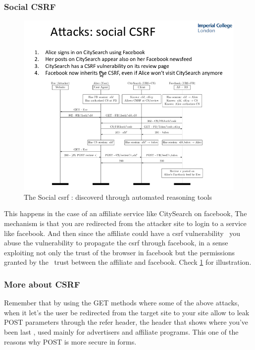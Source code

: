 \subsubsection{Social CSRF}

\begin{figure}[H]
\centering
\includegraphics[width=1\textwidth]{./socialcsrf.png}
\caption{\label{fig:socialcsrf}The Social csrf : discoverd through automated reasoning tools }
\end{figure}
This happens in the case of an affiliate service like CitySearch on facebook, 
The mechanism is that you are redirected from the attacker site to login to a service like facebook. And then since the affiliate could have a csrf vulnerability \
you abuse the vulnerability to propagate the csrf through facebook, in a sense exploiting not only the trust of the browser in facebook but the permissions granted by the \
trust between the affiliate and facebook. Check \ref{fig:socialcsrf} for illustration.

\subsubsection{More about CSRF}

Remember that by using the GET methods where some of the above attacks, when it let's the user be redirected from the target site to your site allow to leak POST parameters through the 
refer header, the header that shows where you've been last , used mainly for advertisers and affiliate programs. This one of the reasons why POST is more secure in forms.


